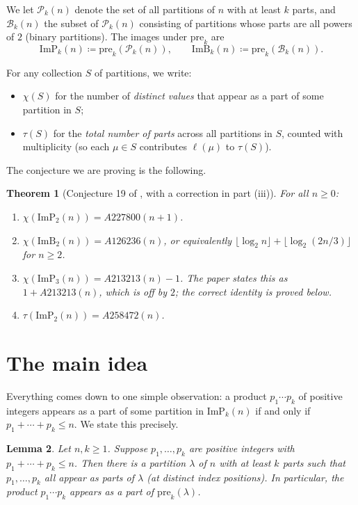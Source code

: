 \documentclass[11pt]{article}
\newtheorem{theorem}{Theorem}
\newtheorem{lemma}[theorem]{Lemma}
\theoremstyle{remark}
\begin{document}
We let $\mathcal{P}_k(n)$ denote the set of all partitions of $n$ with at least $k$ parts, and $\mathcal{B}_k(n)$ the subset of $\mathcal{P}_k(n)$ consisting of partitions whose parts are all powers of $2$ (binary partitions). The images under $\mathrm{pre}_k$ are
\[
\mathrm{ImP}_k(n) \coloneqq \mathrm{pre}_k\!\left(\mathcal{P}_k(n)\right), \qquad
\mathrm{ImB}_k(n) \coloneqq \mathrm{pre}_k\!\left(\mathcal{B}_k(n)\right).
\]

For any collection $S$ of partitions, we write:
\begin{itemize}
\item $\chi(S)$ for the number of \emph{distinct values} that appear as a part of some partition in $S$;
\item $\tau(S)$ for the \emph{total number of parts} across all partitions in $S$, counted with multiplicity (so each $\mu \in S$ contributes $\ell(\mu)$ to $\tau(S)$).
\end{itemize}

The conjecture we are proving is the following.

\begin{theorem}[Conjecture 19 of \cite{BBMS}, with a correction in part (iii)]\label{thm:main}
For all $n \geq 0$:
\begin{enumerate}
\item[(i)] $\chi(\mathrm{ImP}_2(n)) = A227800(n+1)$.
\item[(ii)] $\chi(\mathrm{ImB}_2(n)) = A126236(n)$, or equivalently $\lfloor \log_2 n \rfloor + \lfloor \log_2(2n/3) \rfloor$ for $n \geq 2$.
\item[(iii)] $\chi(\mathrm{ImP}_3(n)) = A213213(n) - 1$. The paper states this as $1 + A213213(n)$, which is off by $2$; the correct identity is proved below.
\item[(iv)] $\tau(\mathrm{ImP}_2(n)) = A258472(n)$.
\end{enumerate}
\end{theorem}

\section{The main idea}

Everything comes down to one simple observation: a product $p_1 \cdots p_k$ of positive integers appears as a part of some partition in $\mathrm{ImP}_k(n)$ if and only if $p_1 + \cdots + p_k \leq n$. We state this precisely.

\begin{lemma}\label{lem:real}
Let $n, k \geq 1$. Suppose $p_1, \dots, p_k$ are positive integers with $p_1 + \cdots + p_k \leq n$. Then there is a partition $\lambda$ of $n$ with at least $k$ parts such that $p_1, \dots, p_k$ all appear as parts of $\lambda$ (at distinct index positions). In particular, the product $p_1 \cdots p_k$ appears as a part of $\mathrm{pre}_k(\lambda)$.
\end{lemma}
\end{document}
